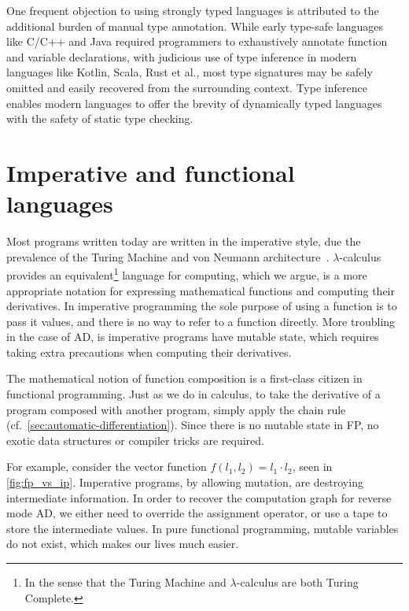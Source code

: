 \documentclass[12pt,initial,twoside,maitrise]{dms}
\numberwithin{equation}{section}
\numberwithin{table}{chapter}
\numberwithin{figure}{chapter}
\begin{document}
One frequent objection to using strongly typed languages is attributed to the additional burden of manual type annotation. While early type-safe languages like C/C++ and Java required programmers to exhaustively annotate function and variable declarations, with judicious use of type inference in modern languages like Kotlin, Scala, Rust et al., most type signatures may be safely omitted and easily recovered from the surrounding context. Type inference enables modern languages to offer the brevity of dynamically typed languages with the safety of static type checking.

\section{Imperative and functional languages}

Most programs written today are written in the imperative style, due the prevalence of the Turing Machine and von Neumann architecture~\citep{backus2007can}. $\lambda$-calculus provides an equivalent\footnote{In the sense that the Turing Machine and $\lambda$-calculus are both Turing Complete.} language for computing, which we argue, is a more appropriate notation for expressing mathematical functions and computing their derivatives. In imperative programming the sole purpose of using a function is to pass it values, and there is no way to refer to a function directly. More troubling in the case of AD, is imperative programs have mutable state, which requires taking extra precautions when computing their derivatives.

The mathematical notion of function composition is a first-class citizen in functional programming. Just as we do in calculus, to take the derivative of a program composed with another program, simply apply the chain rule (cf.~\autoref{sec:automatic-differentiation}). Since there is no mutable state in FP, no exotic data structures or compiler tricks are required.

For example, consider the vector function $f(l_1, l_2) = l_1 \cdot l_2$, seen in \autoref{fig:fp_vs_ip}. Imperative programs, by allowing mutation, are destroying intermediate information. In order to recover the computation graph for reverse mode AD, we either need to override the assignment operator, or use a tape to store the intermediate values. In pure functional programming, mutable variables do not exist, which makes our lives much easier.
\end{document}
